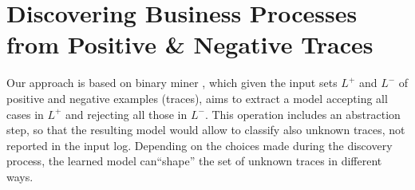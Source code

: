 
\section{Discovering Business Processes from Positive \& Negative Traces}
\label{sec:deviant}


Our approach is based on \nd binary miner \cite{deviant-tkde}, which given the input sets $L^{+}$ and $L^{-}$ of positive and negative examples (traces), aims to extract a model accepting all cases in $L^{+}$ and rejecting all those in $L^{-}$. This operation includes an abstraction step, so that the resulting model would allow to classify also unknown traces, not reported in the input log. Depending on the choices made during the discovery process, the learned model can``shape'' the set of unknown traces in different ways.
